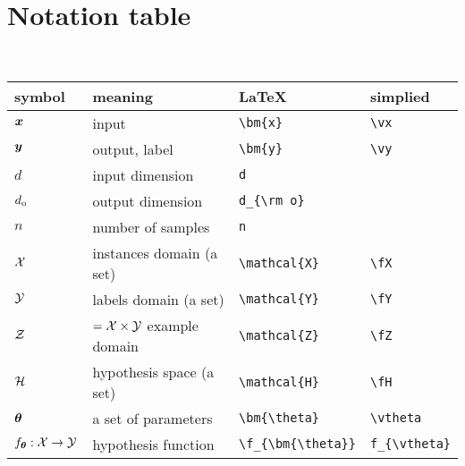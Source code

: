 \documentclass{article}
\begin{document}
\section{Notation table}~\\
\begin{center}
    \begin{tabular}{llll}
        \toprule
        symbol                                              & meaning                                 & \LaTeX                  & simplied                \\
        \midrule

        $\bm{x}$                                               & input                                   & \verb!\bm{x}!  & \verb!\vx!  \\
        $\bm{y}$                                               & output, label                           & \verb!\bm{y}!  & \verb!\vy!  \\
        $d$                                                 & input dimension                         & \verb!d!  &                         \\
        $d_{\rm o}$                                         & output dimension                        & \verb!d_{\rm o}!  &                         \\
        $n$                                                 & number of samples                       & \verb!n!                            \\
        $\mathcal{X}$
                                                            & instances domain (a set)                & \verb!\mathcal{X}!  & \verb!\fX!  \\
        $\mathcal{Y}$
                                                            & labels domain (a set)                   & \verb!\mathcal{Y}! & \verb!\fY! \\
        $\mathcal{Z}$                                               & $=\mathcal{X}\times\mathcal{Y}$ example domain          & \verb!\mathcal{Z}! & \verb!\fZ! \\
        $\mathcal{H}$                                               & hypothesis space (a set)                & \verb!\mathcal{H}! & \verb!\fH! \\
        $\bm{\theta}$                                           & a set of parameters                     & \verb!\bm{\theta}! & \verb!\vtheta! \\
        $f_{\bm{\theta}}:\mathcal{X}\to \mathcal{Y}$                            & hypothesis function                     & \verb!\f_{\bm{\theta}}! & \verb!f_{\vtheta}! \\

\end{tabular}
\end{center}
\end{document}
